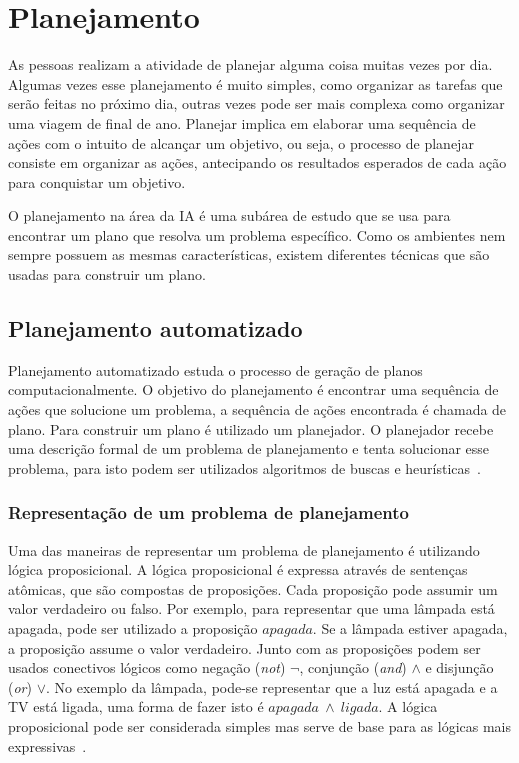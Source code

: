 \chapter{Planejamento}
\label{chap:planejamento}

As pessoas realizam a atividade de planejar alguma coisa muitas vezes por dia.
Algumas vezes esse planejamento é muito simples, como organizar as tarefas que serão feitas no próximo dia, outras vezes pode ser mais complexa como organizar uma viagem de final de ano. Planejar implica em elaborar uma sequência de ações com o intuito de alcançar um objetivo, ou seja, o processo de planejar consiste em organizar as ações, antecipando os resultados esperados de cada ação para conquistar um objetivo. 

O planejamento na área da IA é uma subárea de estudo que se usa para encontrar um plano que resolva um problema específico. Como os ambientes nem sempre possuem as mesmas características, existem diferentes técnicas que são usadas para construir um plano.

\section{Planejamento automatizado}
\label{sec:classicalPlanning}

Planejamento automatizado estuda o processo de geração de planos computacionalmente. O objetivo do planejamento é encontrar uma sequência de ações que solucione um problema, a sequência de ações encontrada é chamada de plano. Para construir um plano é utilizado um planejador. O planejador recebe uma descrição formal de um problema de planejamento e tenta solucionar esse problema, para isto podem ser utilizados algoritmos de buscas e heurísticas~\cite{ghallab2004automated}\cite[Capítulo 10]{intelligence2003modern}.

\subsection{Representação de um problema de planejamento}
\label{subsec:classicalPlanningRep}

Uma das maneiras de representar um problema de planejamento é utilizando lógica proposicional.
A lógica proposicional é expressa através de sentenças atômicas, que são compostas de proposições. 
Cada proposição pode assumir um valor verdadeiro ou falso. 
Por exemplo, para representar que uma lâmpada está apagada, pode ser utilizado a proposição $apagada$.
Se a lâmpada estiver apagada, a proposição assume o valor verdadeiro. 
Junto com as proposições podem ser usados conectivos lógicos como negação (\textit{not}) $\neg$, conjunção (\textit{and}) $\wedge$ e disjunção (\textit{or}) $\vee$. 
No exemplo da lâmpada, pode-se representar que a luz está apagada e a TV está ligada, uma forma de fazer isto é $apagada~ \wedge~ ligada$. 
A lógica proposicional pode ser considerada simples mas serve de base para as lógicas mais expressivas~\cite[Capítulo 10]{intelligence2003modern}. 

